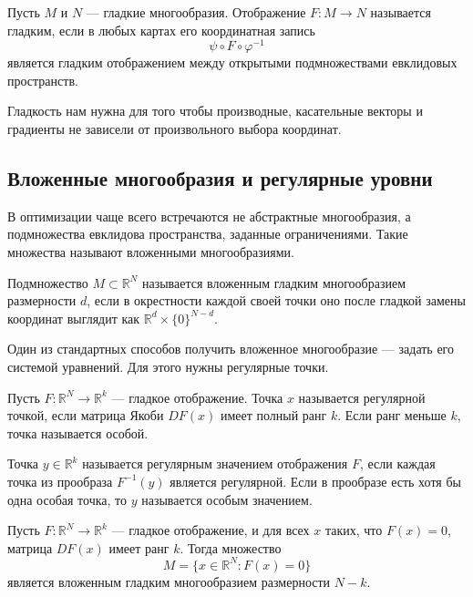 \documentclass[a4paper,12pt]{article}
\newcommand{\R}{\mathbb{R}}
\begin{document}
\begin{definition}
Пусть $M$ и $N$ --- гладкие многообразия. Отображение $F:M\to N$ называется гладким, если в любых картах его координатная запись
\[
\psi\circ F\circ\varphi^{-1}
\]
является гладким отображением между открытыми подмножествами евклидовых пространств.
\end{definition}

Гладкость нам нужна для того чтобы производные, касательные векторы и градиенты не зависели от произвольного выбора координат.

\subsection{Вложенные многообразия и регулярные уровни}

В оптимизации чаще всего встречаются не абстрактные многообразия, а подмножества евклидова пространства, заданные ограничениями. Такие множества называют вложенными многообразиями.

\begin{definition}
Подмножество $M\subset\R^N$ называется вложенным гладким многообразием размерности $d$, если в окрестности каждой своей точки оно после гладкой замены координат выглядит как $\R^d\times\{0\}^{N-d}$.
\end{definition}

Один из стандартных способов получить вложенное многообразие --- задать его системой уравнений. Для этого нужны регулярные точки.

\begin{definition}
Пусть $F:\R^N\to\R^k$ --- гладкое отображение. Точка $x$ называется регулярной точкой, если матрица Якоби $DF(x)$ имеет полный ранг $k$. Если ранг меньше $k$, точка называется особой.
\end{definition}

\begin{definition}
Точка $y\in\R^k$ называется регулярным значением отображения $F$, если каждая точка из прообраза $F^{-1}(y)$ является регулярной. Если в прообразе есть хотя бы одна особая точка, то $y$ называется особым значением.
\end{definition}

\begin{theorem}
Пусть $F:\R^N\to\R^k$ --- гладкое отображение, и для всех $x$ таких, что $F(x)=0$, матрица $DF(x)$ имеет ранг $k$. Тогда множество
\[
M=\{x\in\R^N:F(x)=0\}
\]
является вложенным гладким многообразием размерности $N-k$.
\end{theorem}
\end{document}
